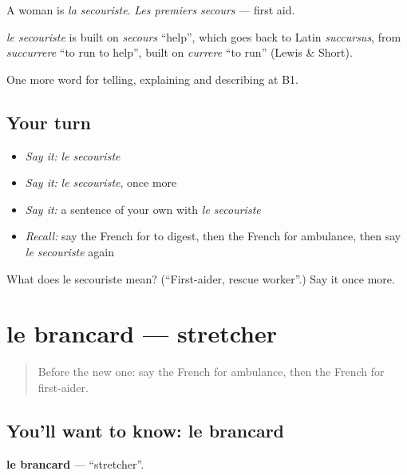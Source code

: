 A woman is \emph{la secouriste}. \emph{Les premiers secours} — first aid.

\begin{cousinweb}
\emph{le secouriste} is built on \emph{secours} \textquotedblleft{}help\textquotedblright{}, which goes back to Latin \emph{succursus}, from \emph{succurrere} \textquotedblleft{}to run to help\textquotedblright{}, built on \emph{currere} \textquotedblleft{}to run\textquotedblright{} (Lewis \& Short).
\end{cousinweb}

\begin{grammarlens}[title={What you've built}]
One more word for telling, explaining and describing at B1.
\end{grammarlens}

\subsection*{Your turn}
\begin{itemize}
\raggedright
  \item \emph{Say it:} \emph{le secouriste}
  \item \emph{Say it:} \emph{le secouriste}, once more
  \item \emph{Say it:} a sentence of your own with \emph{le secouriste}
  \item \emph{Recall:} say the French for to digest, then the French for ambulance, then say \emph{le secouriste} again
\end{itemize}

\begin{tcolorbox}[breakable,colback=teal!4,colframe=teal!35!black,title={Before you move on}]
What does le secouriste mean? (\textquotedblleft{}First-aider, rescue worker\textquotedblright{}.) Say it once more.
\end{tcolorbox}
\section[le brancard]{le brancard — stretcher}

\label{lesson:FR-C484-brancard}



\begin{quote}
Before the new one: say the French for ambulance, then the French for first-aider.
\end{quote}

\subsection*{You'll want to know: le brancard}
\textbf{le brancard} — \textquotedblleft{}stretcher\textquotedblright{}.

